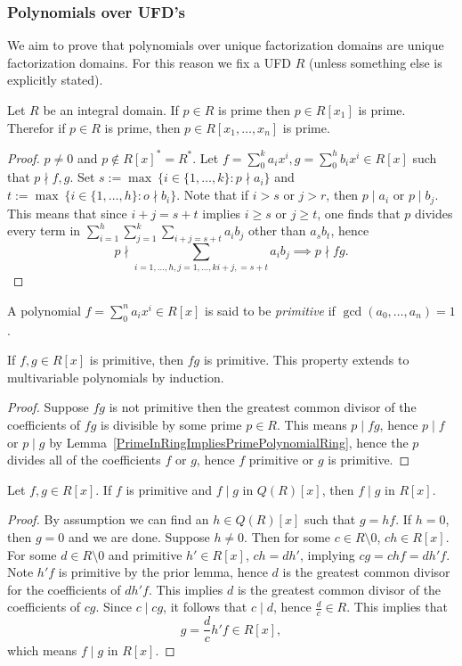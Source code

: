 \subsubsection{Polynomials over UFD's}
We aim to prove that polynomials over unique factorization domains are unique factorization domains. For this reason we fix a UFD $R$ (unless something else is explicitly stated). 
\begin{lemma}\label{PrimeInRingImpliesPrimePolynomialRing}
    Let $R$ be an integral domain. If $p\in R$ is prime then $p\in R[x_1]$ is prime. Therefor if $p\in R$ is prime, then $p\in R[x_1,\dots,x_n]$ is prime.  
\end{lemma}
\begin{proof}
    $p\neq0$ and $p\notin R[x]^\ast = R^\ast$. Let $f=\sum_0^k a_ix^i,g=\sum_0^h b_ix^i\in R[x]$ such that $p\nmid f,g$. Set $s := \max\ \{i\in\{1,\dots,k\} : p\nmid a_i\}$ and $t:= \max\ \{i\in\{1,\dots,h\} : o\nmid b_i\}$. Note that if $i>s$ or $j>r$, then $p\mid a_i$ or $p\mid b_j$. This means that since $i+j = s+t$ implies $i\geq s$ or $j\geq t$, one finds that $p$ divides every term in $\sum_{i=1}^h\sum_{j=1}^k \sum_{i+j = s+t} a_ib_j$ other than $a_sb_t$, hence $$p\nmid \sum_{i=1,\dots,h,j=1,\dots,k i+j, = s+t} a_ib_j \implies p\nmid fg.$$  
\end{proof}
\begin{definition}
    A polynomial $f=\sum_0^n a_ix^i\in R[x]$ is said to be \textit{primitive} if $\gcd(a_0,\dots,a_n)=1$.
\end{definition}
\begin{lemma}
    If $f,g\in R[x]$ is primitive, then $fg$ is primitive. This property extends to multivariable polynomials by induction.
\end{lemma}
\begin{proof}
    Suppose $fg$ is not primitive then the greatest common divisor of the coefficients of $fg$ is divisible by some prime $p\in R$. This means $p\mid fg$, hence $p\mid f$ or $p\mid g$ by Lemma~\ref{PrimeInRingImpliesPrimePolynomialRing}, hence the $p$ divides all of the coefficients $f$ or $g$, hence $f$ primitive or $g$ is primitive. 
\end{proof}
\begin{lemma}\label{PrimitivePolynomialOverFractionFieldDivisorImpliesDivisorInBaseRing}
    Let $f,g\in R[x]$. If $f$ is primitive and $f\mid g$ in $Q(R)[x]$, then $f\mid g$ in $R[x]$.
\end{lemma}
\begin{proof}
    By assumption we can find an $h\in Q(R)[x]$ such that $g = hf$. If $h=0$, then $g=0$ and we are done. Suppose $h\neq 0$. Then for some $c\in R\setminus 0$, $ch\in R[x]$. For some $d\in R\setminus 0$ and primitive $h'\in R[x]$, $ch=dh'$, implying $cg = chf=dh'f$. Note $h'f$ is primitive by the prior lemma, hence $d$ is the greatest common divisor for the coefficients of $dh'f$. This implies $d$ is the greatest common divisor of the coefficients of $cg$. Since $c\mid cg$, it follows that $c\mid d$, hence $\frac{d}{c}\in R$. This implies that                                     $$g = \frac{d}{c}h'f\in R[x],$$                               
    which means $f\mid g$ in $R[x]$.
\end{proof}
